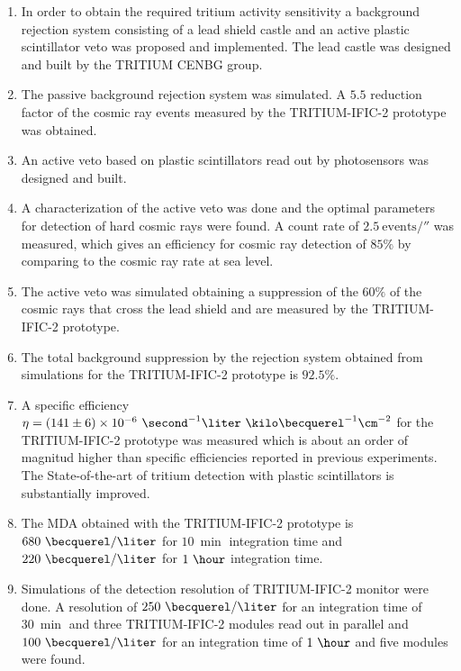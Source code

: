 \begin{enumerate}
\item{} In order to obtain the required tritium activity sensitivity a background rejection system consisting of a lead shield castle and an active plastic scintillator veto was proposed and implemented. The lead castle was designed and built by the TRITIUM CENBG group.

\item{} The passive background rejection system was simulated. A $5.5$ reduction factor of the cosmic ray events measured by the TRITIUM-IFIC-2 prototype was obtained.

\item{} An active veto based on plastic scintillators read out by photosensors was designed and built.

\item{} A characterization of the active veto was done and the optimal parameters for detection of hard cosmic rays were found. A count rate of $2.5~\text{events}/\second$ was measured, which gives an efficiency for cosmic ray detection of $85\%$ by comparing to the cosmic ray rate at sea level.

\item{} The active veto was simulated obtaining a suppression of the $60\%$ of the cosmic rays that cross the lead shield and are measured by the TRITIUM-IFIC-2 prototype.

\item{} The total background suppression by the rejection system obtained from simulations for the TRITIUM-IFIC-2 prototype is $92.5\%$.

\item{} A specific efficiency $\eta = (141 \pm 6) \times 10^{-6}~ \second^{-1}  \liter ~ \kilo\becquerel^{-1} \cm^{-2}$ for the TRITIUM-IFIC-2  prototype was measured which is about an order of magnitud higher than specific efficiencies reported in previous experiments. The State-of-the-art of tritium detection with plastic scintillators is substantially improved.

\item{} The MDA obtained with the TRITIUM-IFIC-2 prototype is $680~\becquerel/\liter$  for $10~\min$ integration time and $220~\becquerel/\liter$  for $1~\hour$ integration time.

\item{} Simulations of the detection resolution of TRITIUM-IFIC-2 monitor were done. A resolution of $250~\becquerel/\liter$ for an integration time of $30~\min$ and three TRITIUM-IFIC-2 modules read out in parallel and $100~\becquerel/\liter$ for an integration time of $1~\hour$ and five modules were found.


\end{enumerate}
